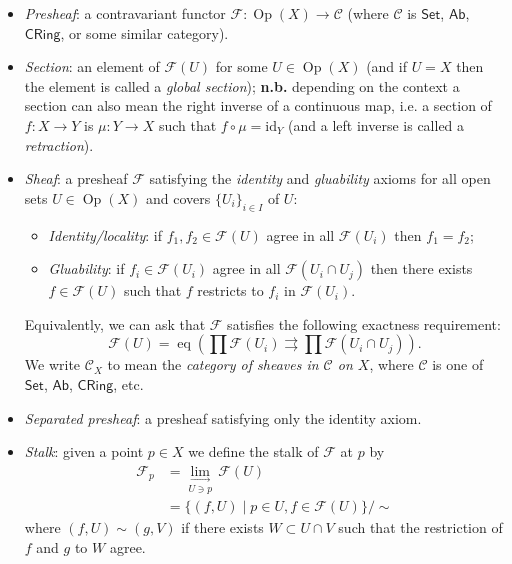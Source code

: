 \documentclass[10pt]{article}
\DeclareMathOperator{\Op}{Op}
\DeclareMathOperator{\eq}{eq}
\newcommand{\dirlim}[1]{\underset{#1}{\lim\limits_{\longrightarrow}}\,}
\newcommand{\Set}{\mathsf{Set}}
\newcommand{\Ab}{\mathsf{Ab}}
\newcommand{\CRing}{\mathsf{CRing}}
\newcommand{\ccat}{\mathcal{C}}
\newcommand{\fsheaf}{\mathcal{F}}
\newcommand{\id}{\mathrm{id}}
\begin{document}
                \begin{itemize}
                    \item \textit{Presheaf}: a contravariant functor $\fsheaf\colon\Op(X)\to\ccat$ (where $\ccat$ is $\Set$, $\Ab$, $\CRing$, or some similar category).
                    \item \textit{Section}: an element of $\fsheaf(U)$ for some $U\in\Op(X)$ (and if $U=X$ then the element is called a \textit{global section}); \textbf{n.b.} depending on the context a section can also mean the right inverse of a continuous map, i.e. a section of $f\colon X\to Y$ is $\mu\colon Y\to X$ such that $f\circ\mu = \id_Y$ (and a left inverse is called a \textit{retraction}).
                    \item \textit{Sheaf}: a presheaf $\fsheaf$ satisfying the \textit{identity} and \textit{gluability} axioms for all open sets $U\in\Op(X)$ and covers $\{U_i\}_{i\in I}$ of $U$:
                        \begin{itemize}
                            \item \textit{Identity/locality}: if $f_1,f_2\in\fsheaf(U)$ agree in all $\fsheaf(U_i)$ then $f_1=f_2$;
                            \item \textit{Gluability}: if $f_i\in\fsheaf(U_i)$ agree in all $\fsheaf(U_i\cap U_j)$ then there exists $f\in\fsheaf(U)$ such that $f$ restricts to $f_i$ in $\fsheaf(U_i)$.
                        \end{itemize}
                        Equivalently, we can ask that $\fsheaf$ satisfies the following exactness requirement:
                        \[\fsheaf(U) = \eq\left(\prod\fsheaf(U_i)\rightrightarrows\prod\fsheaf(U_i\cap U_j)\right).\]
                        We write $\ccat_X$ to mean the \textit{category of sheaves in $\ccat$ on $X$}, where $\ccat$ is one of $\Set$, $\Ab$, $\CRing$, etc.
                    \item \textit{Separated presheaf}: a presheaf satisfying only the identity axiom.
                    \item \textit{Stalk}: given a point $p\in X$ we define the stalk of $\fsheaf$ at $p$ by
                        \begin{align*}
                            \fsheaf_p &= \dirlim{U\ni p}\fsheaf(U)\\
                            &= \big\{(f,U) \mid p\in U, f\in\fsheaf(U)\big\}\big/\sim
                        \end{align*}
                        where $(f,U)\sim(g,V)$ if there exists $W\subset U\cap V$ such that the restriction of $f$ and $g$ to $W$ agree.

\end{itemize}
\end{document}
